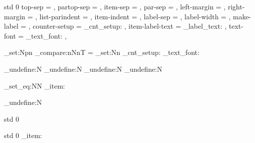  {std} {0}
  {
    top-sep          = \topsep      ,
    partop-sep       = \partopsep   ,
    item-sep         = \itemsep     ,
    par-sep          = \parsep      ,
    left-margin      = \leftmargin  ,
    right-margin     = \rightmargin ,
    list-parindent   = \listparindent ,
    item-indent      = \itemindent  ,
    label-sep        =     ,
    label-width      =   ,
    make-label       = \makelabel   ,
    counter-setup    = \list_cnt_setup: ,
    item-label-text  = \list_label_text:   ,
    text-font        = \list_text_font:  ,             %
  }
  {
   
   \cs_set:Npn \MaybeExecuteEndCode {\endlist}
        {
         \AssignTemplateKeys 
         \dim_compare:nNnT  = \maxdimen
           { \dim_set:Nn  }
         \list_cnt_setup: 
         \list_text_font:
         }
  }


\cs_undefine:N \itemize
\cs_undefine:N \enumerate
\cs_undefine:N \enditemize
\cs_undefine:N \endenumerate

\cs_set_eq:NN \list_item: \item
\cs_undefine:N \item


 {std} {0}
  {}

 {std} {0}
  {}
  {
   \AssignTemplateKeys
   \list_item: 
  }

\ExplSyntaxOff

